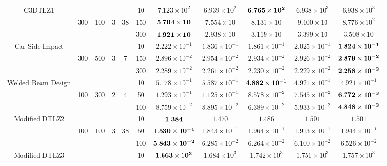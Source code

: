 \documentclass[../main/main]{subfiles}
\begin{document}
\begin{table}[htbp]
\begin{tabular}{c|ccccc|c|c|c|c|c}
\hline
\multirow{3}{*}{C3DTLZ1} &        &   &&    & 10 &  $7.123 \times 10^{2}$ & $6.939 \times 10^{2}$ &  $\bf{6.765 \times 10^{2}}$ & $6.938 \times 10^{3}$ & $6.938 \times 10^{3}$\\
                                          &300 & 100 &3 & 38 & 150 & $\bf{5.704 \times 10}$ & $7.554 \times 10$ &  $8.131 \times 10$ & $9.100 \times 10$ & $8.776 \times 10^{2}$\\
				   &        &    &&    &300 &  $\bf{1.921 \times 10}$ & $2.938 \times 10$ &  $3.119 \times 10$ & $3.399 \times 10$ & $3.508 \times 10$\\
\hline
\multirow{3}{*}{\scriptsize Car Side Impact} &  &&      &       & 10 &$2.222 \times 10^{-1}$ & $1.836 \times 10^{-1}$ & $1.861 \times 10^{-1}$ & $2.025 \times 10^{-1}$ & $\bf{1.824 \times 10 ^{-1}}$\\
  				   &300 & 500 & 3 & 7 & 150 &$2.896 \times 10^{-2}$ &  $2.954 \times 10^{-2}$ & $2.934 \times 10^{-2}$ & $2.926 \times 10^{-2}$ & $\bf{2.879 \times 10^{-2}}$\\
				   &        &   &&     &300 & $2.289 \times 10^{-2}$ & $2.261 \times 10^{-2}$ & $2.230 \times 10^{-2}$ & $2.229 \times 10^{-2}$ & $\bf{2.258 \times 10^{-2}}$\\
\hline
\multirow{3}{*}{\fontsize{6pt}{0pt}\selectfont Welded Beam Design} &   &&     &       & 10 &$5.178 \times 10^{-1}$ & $5.587 \times 10^{-1}$ & $\bf{4.882 \times 10^{-1}}$ & $4.921 \times 10^{-1}$ & $4.921 \times 10^{-1}$\\
  				   &100 & 300 & 2 & 4 & 50 &$1.293 \times 10^{-1}$ & $1.125 \times 10^{-1}$ & $8.578 \times 10^{-2}$ & $7.545 \times 10^{-2}$ & $\bf{6.772 \times 10^{-2}}$\\
				   &        &     &&   &100 &$8.759 \times 10^{-2}$ & $8.895 \times 10^{-2}$ & $6.389 \times 10^{-2}$ & $5.933 \times 10^{-2}$ & $\bf{4.848 \times 10^{-2}}$\\
\hline
\multirow{3}{*}{\fontsize{6.5pt}{0pt}\selectfont Modified DTLZ2} & &&       &       & 10 &$\bf{1.384}$ & $1.470$ & $1.486$ & $1.501$ & $1.501$\\
  				   & 100 & 100 & 3 & 38 &50 &$\bf{1.530 \times 10^{-1}}$ &  $1.843 \times 10^{-1}$ & $1.964 \times 10^{-1}$ & $1.913 \times 10^{-1}$ & $1.944 \times 10^{-1}$\\
				   &        &      &&  &100 & $\bf{5.843 \times 10^{-2}}$ & $6.285 \times 10^{-2}$ & $6.264 \times 10^{-2}$ & $6.100 \times 10^{-2}$ & $6.526 \times 10^{-2}$\\
\hline
\multirow{3}{*}{\fontsize{6.5pt}{0pt}\selectfont Modified DTLZ3} & &&       &       & 10 &$\bf{1.663 \times 10^{3}}$ & $1.684 \times 10^{3}$ & $1.742 \times 10^{3}$ & $1.751 \times 10^{3}$ & $1.757 \times 10 ^{3}$\\

\end{tabular}
\end{table}
\end{document}
